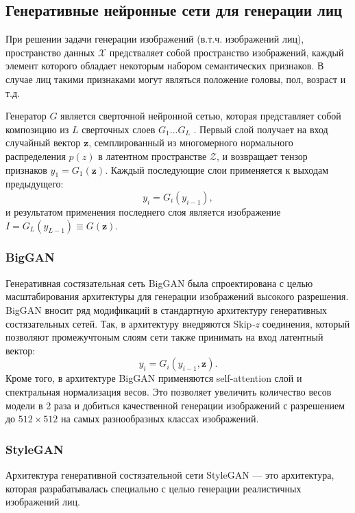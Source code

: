\subsection{Генеративные нейронные сети для генерации лиц}

При решении задачи генерации изображений (в.т.ч. изображений лиц), пространство данных $\mathcal X$ предстваляет собой пространство изображений, каждый элемент которого обладает некоторым набором семантических признаков.
В случае лиц такими признаками могут являться положение головы, пол, возраст и т.д.

Генератор $G$ является сверточной нейронной сетью, которая представляет собой композицию из $L$ сверточных слоев $G_1 ... G_L$ . 
Первый слой получает на вход случайный вектор $\mathbf z$, семплированный из многомерного нормального распределения $p(z)$ в латентном пространстве $\mathcal Z$, и возвращает тензор признаков $y_1 = G_1(\mathbf z)$. 
Каждый последующие слои применяется к выходам предыдущего: 
$$ y_i = G_i(y_{i-1}), $$
и результатом применения последнего слоя является изображение $I = G_L(y_{L-1}) \equiv G(\mathbf z)$.

\subsubsection{BigGAN}

Генеративная состязательная сеть BigGAN \cite{bigGAN} была спроектирована с целью масштабирования архитектуры для генерации изображений высокого разрешения.
BigGAN вносит ряд модификаций в стандартную архитектуру генеративных состязательных сетей.
Так, в архитектуру внедряются Skip\emph{-z} соединения, который позволяют промежучтоным слоям сети также принимать на вход латентный вектор:
$$ y_i = G_i(y_{i-1}, \mathbf z). $$
Кроме того, в архитектуре BigGAN применяются self-attention слой и спектральная нормализация весов.
Это позволяет увеличить количество весов модели в 2 раза и добиться качественной генерации изображений с разрешением до $512\times512$ на самых разнообразных классах изображений.

\subsubsection{StyleGAN}
Архитектура генеративной состязательной сети StyleGAN \cite{StyleGAN} --– это архитектура, которая разрабатывалась специально с целью генерации реалистичных изображений лиц.

